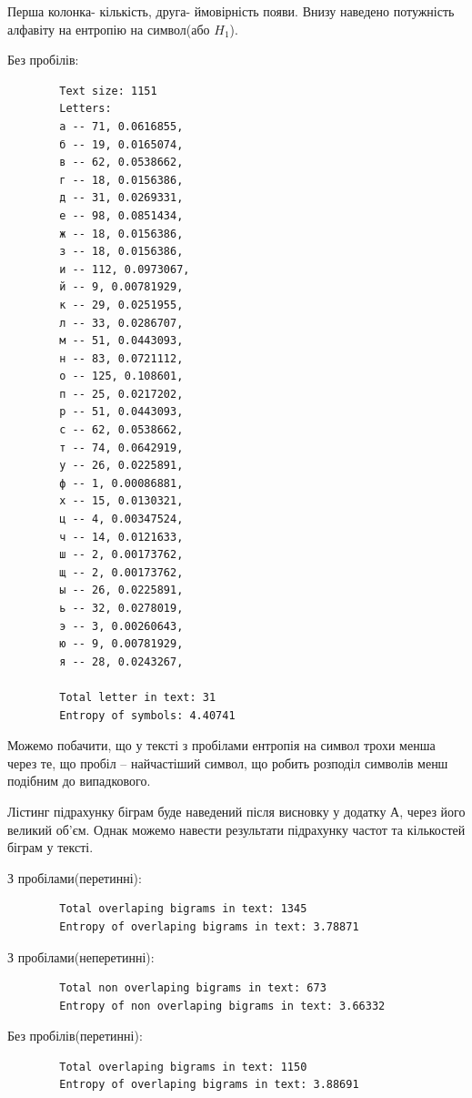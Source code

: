 \documentclass[12pt]{article}
\begin{document}
    Перша колонка- кількість, друга- ймовірність появи. Внизу наведено потужність алфавіту на ентропію на символ(або $H_1$).

    Без пробілів:

    \begin{verbatim}
        Text size: 1151
        Letters: 
        а -- 71, 0.0616855,
        б -- 19, 0.0165074,
        в -- 62, 0.0538662,
        г -- 18, 0.0156386,
        д -- 31, 0.0269331,
        е -- 98, 0.0851434,
        ж -- 18, 0.0156386,
        з -- 18, 0.0156386,
        и -- 112, 0.0973067,
        й -- 9, 0.00781929,
        к -- 29, 0.0251955,
        л -- 33, 0.0286707,
        м -- 51, 0.0443093,
        н -- 83, 0.0721112,
        о -- 125, 0.108601,
        п -- 25, 0.0217202,
        р -- 51, 0.0443093,
        с -- 62, 0.0538662,
        т -- 74, 0.0642919,
        у -- 26, 0.0225891,
        ф -- 1, 0.00086881,
        х -- 15, 0.0130321,
        ц -- 4, 0.00347524,
        ч -- 14, 0.0121633,
        ш -- 2, 0.00173762,
        щ -- 2, 0.00173762,
        ы -- 26, 0.0225891,
        ь -- 32, 0.0278019,
        э -- 3, 0.00260643,
        ю -- 9, 0.00781929,
        я -- 28, 0.0243267,

        Total letter in text: 31
        Entropy of symbols: 4.40741

    \end{verbatim}

    Можемо побачити, що у тексті з пробілами ентропія на символ трохи менша через те, що пробіл -- найчастіший символ,
    що робить розподіл символів менш подібним до випадкового.

    Лістинг підрахунку біграм буде наведений після висновку у додатку А, через його великий об'єм. Однак можемо навести
    результати підрахунку частот та кількостей біграм у тексті.

    З пробілами(перетинні):

    \begin{verbatim}
        Total overlaping bigrams in text: 1345
        Entropy of overlaping bigrams in text: 3.78871
    \end{verbatim}

    З пробілами(неперетинні):
    \begin{verbatim}
        Total non overlaping bigrams in text: 673
        Entropy of non overlaping bigrams in text: 3.66332
    \end{verbatim}

    Без пробілів(перетинні):

    \begin{verbatim}
        Total overlaping bigrams in text: 1150
        Entropy of overlaping bigrams in text: 3.88691
    \end{verbatim}
\end{document}
